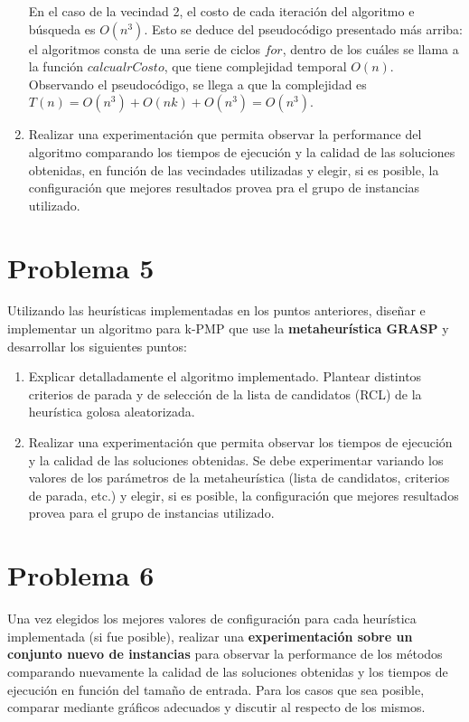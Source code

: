 \documentclass[11pt, a4paper, twoside]{article}
\begin{document}
\begin{enumerate}
			  En el caso de la vecindad 2, el costo de cada iteración del algoritmo e búsqueda es $ O(n^3) $. Esto se deduce
			  del pseudocódigo presentado más arriba: el algoritmos consta de una serie de ciclos $for$, dentro de los
			  cuáles se llama a la función $calcualrCosto$, que tiene complejidad temporal $O(n)$. Observando el pseudocódigo,
			  se llega a que la complejidad es $T(n) = O(n^3) + O(nk) + O(n^3) = O(n^3) $.
			  
	    \item Realizar una experimentación que permita observar la performance del algoritmo comparando los tiempos
			  de ejecución y la calidad de las soluciones obtenidas, en función de las vecindades utilizadas y elegir,
			  si es posible, la configuración que mejores resultados provea pra el grupo de instancias utilizado.
    \end{enumerate}




\newpage
\section{Problema 5}
	Utilizando las heurísticas implementadas en los puntos anteriores, diseñar e implementar un algoritmo para k-PMP que
	use la \textbf{metaheurística GRASP} y desarrollar los siguientes puntos:
	
	 \begin{enumerate}
	 
		\item Explicar detalladamente el algoritmo implementado. Plantear distintos criterios de parada y de selección de la 
			  lista de candidatos (RCL) de la heurística golosa aleatorizada.
			  
		\item Realizar una experimentación que permita observar los tiempos de ejecución y la calidad de las soluciones
			  obtenidas. Se debe experimentar variando los valores de los parámetros de la metaheurística (lista de candidatos,
			  criterios de parada, etc.) y elegir, si es posible, la configuración que mejores resultados provea para el
			  grupo de instancias utilizado.
			  
	 \end{enumerate}



\newpage
\section{Problema 6}
	Una vez elegidos los mejores valores de configuración para cada heurística implementada (si fue posible), realizar
	una \textbf{experimentación sobre un conjunto nuevo de instancias} para observar la performance de los métodos comparando
	nuevamente la calidad de las soluciones obtenidas y los tiempos de ejecución en función del tamaño de entrada. Para
	los casos que sea posible, comparar mediante gráficos adecuados y discutir al respecto de los mismos.


\end{document}

